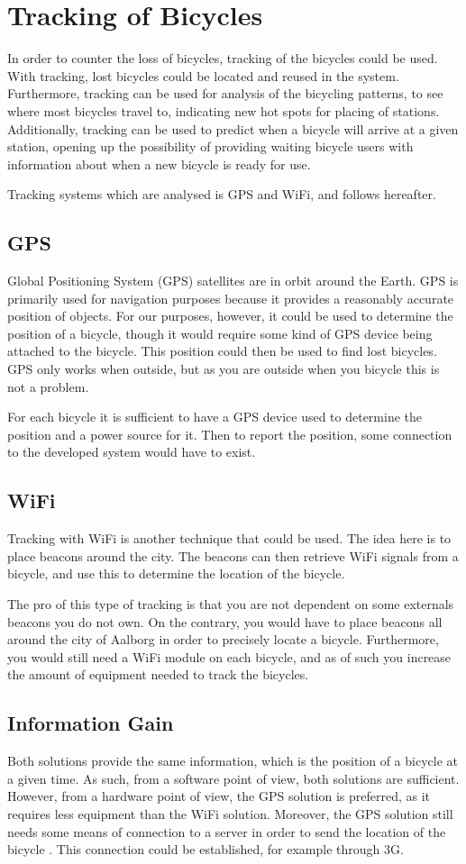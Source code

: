 \section{Tracking of Bicycles}
In order to counter the loss of bicycles, tracking of the bicycles could be used.
With tracking, lost bicycles could be located and reused in the system.
Furthermore, tracking can be used for analysis of the bicycling patterns, to see where most bicycles travel to, indicating new hot spots for placing of stations.
Additionally, tracking can be used to predict when a bicycle will arrive at a given station, opening up the possibility of providing waiting bicycle users with information about when a new bicycle is ready for use.

Tracking systems which are analysed is GPS and WiFi, and follows hereafter.
\subsection{GPS}
Global Positioning System (GPS) satellites are in orbit around the Earth.
GPS is primarily used for navigation purposes because it provides a reasonably accurate position of objects.
For our purposes, however, it could be used to determine the position of a bicycle, though it would require some kind of GPS device being attached to the bicycle.
This position could then be used to find lost bicycles.
GPS only works when outside, but as you are outside when you bicycle this is not a problem.

For each bicycle it is sufficient to have a GPS device used to determine the position and a power source for it.
Then to report the position, some connection to the developed system would have to exist.

\subsection{WiFi}
Tracking with WiFi is another technique that could be used.
The idea here is to place beacons around the city.
The beacons can then retrieve WiFi signals from a bicycle, and use this to determine the location of the bicycle.

The pro of this type of tracking is that you are not dependent on some externals beacons you do not own.
On the contrary, you would have to place beacons all around the city of Aalborg in order to precisely locate a bicycle.
Furthermore, you would still need a WiFi module on each bicycle, and as of such you increase the amount of equipment needed to track the bicycles.

\subsection{Information Gain}
Both solutions provide the same information, which is the position of a bicycle at a given time.
As such, from a software point of view, both solutions are sufficient.
However, from a hardware point of view, the GPS solution is preferred, as it requires less equipment than the WiFi solution. 
Moreover, the GPS solution still needs some means of connection to a server in order to send the location of the bicycle \citep{misc:gpsSystem}. 
This connection could be established, for example through 3G.
